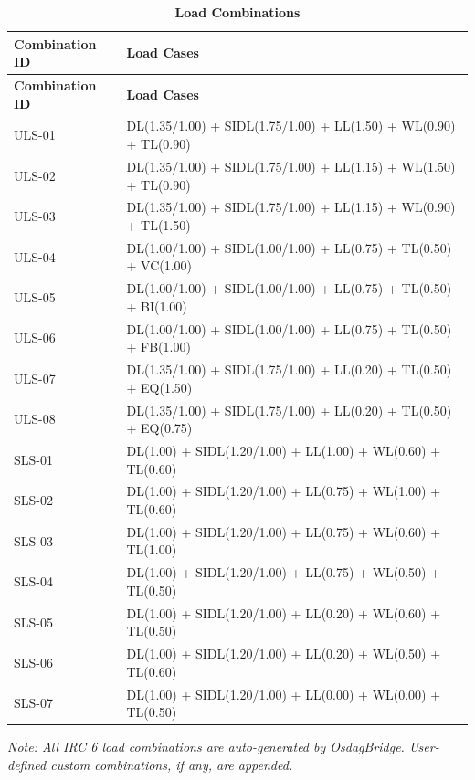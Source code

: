 \documentclass[12pt,a4paper]{report}
\numberwithin{table}{chapter}
\numberwithin{figure}{chapter}
\begin{document}
\vspace{1em}
\begin{longtable}{|C{4.0cm}|p{11.5cm}|}
\caption{\textbf{Load Combinations}}\\
\hline
\textbf{Combination ID} & \textbf{Load Cases} \\[6pt]
\hline
\endfirsthead
\hline
\textbf{Combination ID} & \textbf{Load Cases} \\[6pt]
\hline
\endhead
ULS-01 & DL(1.35/1.00) + SIDL(1.75/1.00) + LL(1.50) + WL(0.90) + TL(0.90) \\[6pt]
\hline
ULS-02 & DL(1.35/1.00) + SIDL(1.75/1.00) + LL(1.15) + WL(1.50) + TL(0.90) \\[6pt]
\hline
ULS-03 & DL(1.35/1.00) + SIDL(1.75/1.00) + LL(1.15) + WL(0.90) + TL(1.50) \\[6pt]
\hline
ULS-04 & DL(1.00/1.00) + SIDL(1.00/1.00) + LL(0.75) + TL(0.50) + VC(1.00) \\[6pt]
\hline
ULS-05 & DL(1.00/1.00) + SIDL(1.00/1.00) + LL(0.75) + TL(0.50) + BI(1.00) \\[6pt]
\hline
ULS-06 & DL(1.00/1.00) + SIDL(1.00/1.00) + LL(0.75) + TL(0.50) + FB(1.00) \\[6pt]
\hline
ULS-07 & DL(1.35/1.00) + SIDL(1.75/1.00) + LL(0.20) + TL(0.50) + EQ(1.50) \\[6pt]
\hline
ULS-08 & DL(1.35/1.00) + SIDL(1.75/1.00) + LL(0.20) + TL(0.50) + EQ(0.75) \\[6pt]
\hline
SLS-01 & DL(1.00) + SIDL(1.20/1.00) + LL(1.00) + WL(0.60) + TL(0.60) \\[6pt]
\hline
SLS-02 & DL(1.00) + SIDL(1.20/1.00) + LL(0.75) + WL(1.00) + TL(0.60) \\[6pt]
\hline
SLS-03 & DL(1.00) + SIDL(1.20/1.00) + LL(0.75) + WL(0.60) + TL(1.00) \\[6pt]
\hline
SLS-04 & DL(1.00) + SIDL(1.20/1.00) + LL(0.75) + WL(0.50) + TL(0.50) \\[6pt]
\hline
SLS-05 & DL(1.00) + SIDL(1.20/1.00) + LL(0.20) + WL(0.60) + TL(0.50) \\[6pt]
\hline
SLS-06 & DL(1.00) + SIDL(1.20/1.00) + LL(0.20) + WL(0.50) + TL(0.60) \\[6pt]
\hline
SLS-07 & DL(1.00) + SIDL(1.20/1.00) + LL(0.00) + WL(0.00) + TL(0.50) \\[6pt]
\hline
\end{longtable}

\noindent\textit{Note: All IRC 6 load combinations are auto-generated by OsdagBridge. User-defined custom combinations, if any, are appended.}
\end{document}
